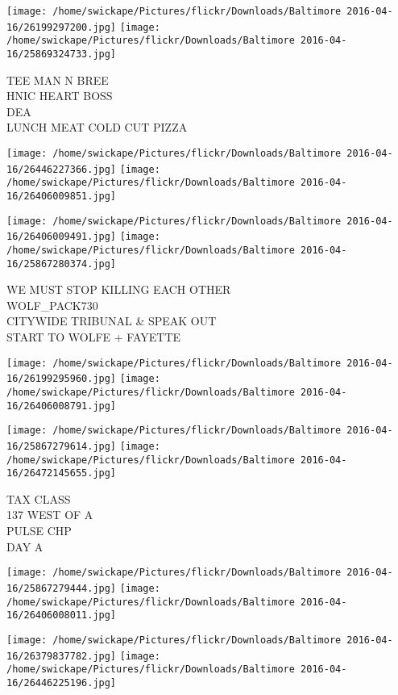 \documentclass[10pt,letterpaper]{article}
\begin{document}
\texttt{[image: /home/swickape/Pictures/flickr/Downloads/Baltimore 2016-04-16/26199297200.jpg]}
\texttt{[image: /home/swickape/Pictures/flickr/Downloads/Baltimore 2016-04-16/25869324733.jpg]}

TEE MAN N BREE\\
HNIC HEART BOSS\\
DEA\\
LUNCH MEAT COLD CUT PIZZA\\
\pagebreak

\texttt{[image: /home/swickape/Pictures/flickr/Downloads/Baltimore 2016-04-16/26446227366.jpg]}
\texttt{[image: /home/swickape/Pictures/flickr/Downloads/Baltimore 2016-04-16/26406009851.jpg]}

\texttt{[image: /home/swickape/Pictures/flickr/Downloads/Baltimore 2016-04-16/26406009491.jpg]}
\texttt{[image: /home/swickape/Pictures/flickr/Downloads/Baltimore 2016-04-16/25867280374.jpg]}

WE MUST STOP KILLING EACH OTHER\\
WOLF\_PACK730\\
CITYWIDE TRIBUNAL \& SPEAK OUT\\
START TO WOLFE + FAYETTE\\
\pagebreak

\texttt{[image: /home/swickape/Pictures/flickr/Downloads/Baltimore 2016-04-16/26199295960.jpg]}
\texttt{[image: /home/swickape/Pictures/flickr/Downloads/Baltimore 2016-04-16/26406008791.jpg]}

\texttt{[image: /home/swickape/Pictures/flickr/Downloads/Baltimore 2016-04-16/25867279614.jpg]}
\texttt{[image: /home/swickape/Pictures/flickr/Downloads/Baltimore 2016-04-16/26472145655.jpg]}

TAX CLASS\\
137 WEST OF A\\
PULSE CHP\\
DAY A\\
\pagebreak

\texttt{[image: /home/swickape/Pictures/flickr/Downloads/Baltimore 2016-04-16/25867279444.jpg]}
\texttt{[image: /home/swickape/Pictures/flickr/Downloads/Baltimore 2016-04-16/26406008011.jpg]}

\texttt{[image: /home/swickape/Pictures/flickr/Downloads/Baltimore 2016-04-16/26379837782.jpg]}
\texttt{[image: /home/swickape/Pictures/flickr/Downloads/Baltimore 2016-04-16/26446225196.jpg]}
\end{document}
